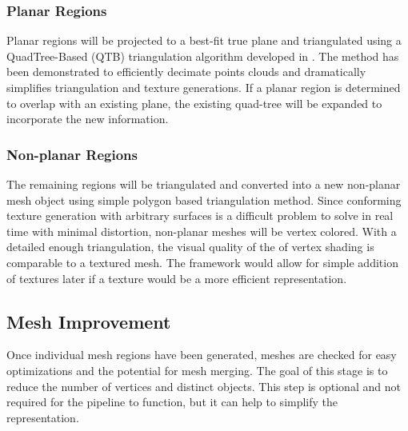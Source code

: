 \documentclass[english]{article}
\begin{document}
\subsubsection{Planar Regions}
Planar regions will be projected to a best-fit true plane and triangulated using a QuadTree-Based (QTB) triangulation algorithm developed in \cite{planesegmentationQTB}. The method has been demonstrated to efficiently decimate points clouds and dramatically simplifies triangulation and texture generations. If a planar region is determined to overlap with an existing plane, the existing quad-tree will be expanded to incorporate the new information.

\subsubsection{Non-planar Regions}
The remaining regions will be triangulated and converted into a new non-planar mesh object using simple polygon based triangulation method. Since conforming texture generation with arbitrary surfaces is a difficult problem to solve in real time with minimal distortion, non-planar meshes will be vertex colored. With a detailed enough triangulation, the visual quality of the of vertex shading is comparable to a textured mesh. The framework would allow for simple addition of textures later if a texture would be a more efficient representation.

\subsection{Mesh Improvement}
Once individual mesh regions have been generated, meshes are checked for easy optimizations and the potential for mesh merging. The goal of this stage is to reduce the number of vertices and distinct objects. This step is optional and not required for the pipeline to function, but it can help to simplify the representation. 




\end{document}
